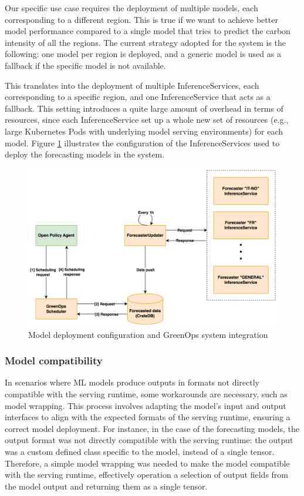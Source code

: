 Our specific use case requires the deployment of multiple models, each corresponding to a different region.
This is true if we want to achieve better model performance compared to a single model that tries to predict the carbon intensity of all the regions.
The current strategy adopted for the system is the following: one model per region is deployed, and a generic model is used as a fallback if the specific model is not available.

This translates into the deployment of multiple InferenceServices, each corresponding to a specific region, and one InferenceService that acts as a fallback.
This setting introduces a quite large amount of overhead in terms of resources, since each InferenceService set up a whole new set of resources (e.g., large Kubernetes Pods with underlying model serving environments) for each model.
Figure \ref{fig:forecaster} illustrates the configuration of the InferenceServices used to deploy the forecasting models in the system.

\begin{figure}[htb]
  \centering
  \includegraphics[width=1\linewidth]{images/forecaster.png}
  \caption{Model deployment configuration and GreenOps system integration}
  \label{fig:forecaster}
\end{figure}

\subsubsection{Model compatibility}

In scenarios where ML models produce outputs in formats not directly compatible with the serving runtime, some workarounds are necessary, such as model wrapping. This process involves adapting the model's input and output interfaces to align with the expected formats of the serving runtime, ensuring a correct model deployment.
For instance, in the case of the forecasting models, the output format was not directly compatible with the serving runtime: the output was a custom defined class specific to the model, instead of a single tensor. Therefore, a simple model wrapping was needed to make the model compatible with the serving runtime, effectively operation a selection of output fields from the model output and returning them as a single tensor.

